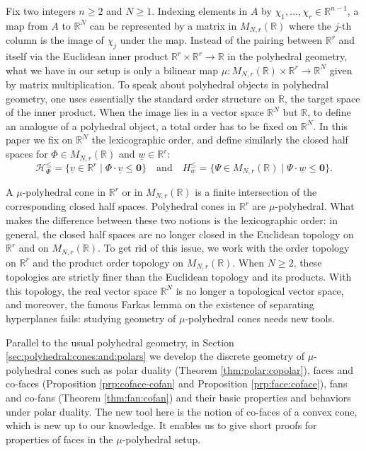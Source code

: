 \documentclass[12pt, a4article]{amsart}   	%
\numberwithin{equation}{section}
\theoremstyle{plain}
\theoremstyle{definition}
\newcommand{\mcH}{{\mathcal H}}
\newcommand{\uv}{{\underline v}}
\begin{document}
Fix two integers $n\geq 2$ and $N\geq 1$. Indexing elements in $A$ by $\chi_1,\ldots,\chi_r\in\mathbb{R}^{n-1}$, a map from $A$ to $\mathbb{R}^N$ can be represented by a matrix in $M_{N,r}(\mathbb{R})$ where the $j$-th column is the image of $\chi_j$ under the map. Instead of the pairing between $\mathbb{R}^r$ and itself via the Euclidean inner product $\mathbb{R}^r\times\mathbb{R}^r\to\mathbb{R}$ in the polyhedral geometry, what we have in our setup is only a bilinear map $\mu: M_{N,r}(\mathbb{R})\times\mathbb{R}^r\to\mathbb{R}^N$ given by matrix multiplication. To speak about polyhedral objects in polyhedral geometry, one uses essentially the standard order structure on $\mathbb{R}$, the target space of the inner product. When the image lies in a vector space $\mathbb{R}^N$ but $\mathbb{R}$, to define an analogue of a polyhedral object, a total order has to be fixed on $\mathbb{R}^N$. In this paper we fix on $\mathbb{R}^N$ the lexicographic order, and define similarly the closed half spaces for $\Phi\in M_{N,r}(\mathbb{R})$ and $\underline{w}\in\mathbb{R}^r$:
$$\mcH_{ {\Phi}}^\leq=\{\uv\in \mathbb R^r\mid \Phi\cdot\uv\le \mathbf 0\}\quad\text{and}\quad
H_{ {\underline{w}}}^\leq =\{\Psi\in M_{N,r}(\mathbb R)\mid \Psi\cdot\underline{w}\le \mathbf 0\}.$$

A $\mu$-polyhedral cone in $\mathbb{R}^r$ or in $M_{N,r}(\mathbb{R})$ is a finite intersection of the corresponding closed half spaces. Polyhedral cones in $\mathbb{R}^r$ are $\mu$-polyhedral. What makes the difference between these two notions is the lexicographic order: in general, the closed half spaces are no longer closed in the Euclidean topology on $\mathbb{R}^r$ and on $M_{N,r}(\mathbb{R})$. To get rid of this issue, we work with the order topology on $\mathbb{R}^r$ and the product order topology on $M_{N,r}(\mathbb{R})$. When $N\geq 2$, these topologies are strictly finer than the Euclidean topology and its products. With this topology, the real vector space $\mathbb{R}^N$ is no longer a topological vector space, and moreover, the famous Farkas lemma on the existence of separating hyperplanes fails: studying geometry of $\mu$-polyhedral cones needs new tools.

Parallel to the usual polyhedral geometry, in Section \ref{sec:polyhedral:cones:and:polars} we develop the discrete geometry of $\mu$-polyhedral cones such as polar duality (Theorem \ref{thm:polar:copolar}), faces and co-faces (Proposition \ref{prp:coface-cofan} and Proposition \ref{prp:face:coface}), fans and co-fans (Theorem \ref{thm:fan:cofan}) and their basic properties and behaviors under polar duality. The new tool here is the notion of co-faces of a convex cone, which is new up to our knowledge. It enables us to give short proofs for properties of faces in the $\mu$-polyhedral setup.
\end{document}

